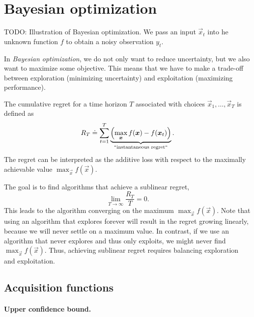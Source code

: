 \section{Bayesian optimization} \label{sec:bo}

\begin{marginfigure}
  \centering
  \caption{TODO: Illustration of Bayesian optimization. We pass an input
  $\vec{x}_t$ into he unknown function $f$ to obtain a noisy observation
  $y_t$.}
  \label{fig:bo}
\end{marginfigure}

In \textit{Bayesian optimization}, we do not only want to reduce uncertainty,
but we also want to maximize some objective. This means that we have to make a trade-off between
exploration (minimizing uncertainty) and exploitation (maximizing performance).

\begin{definition}[Regret]
  The cumulative regret for a time horizon $T$ associated with choices
  $\vec{x}_1,\ldots,\vec{x}_T$ is defined as \[
    R_T \doteq \sum_{t=1}^T \underbrace{\lft(\max_{\vec{x}} f(\vec{x}) - f(\vec{x}_t)\rgt)}_{\text{``instantaneous regret``}}
  .\]
  The regret can be interpreted as the additive loss with respect to the
  maximally achievable value $\max_{\vec{x}} f(\vec{x})$.
\end{definition}

The goal is to find algorithms that achieve a sublinear regret, \[
  \lim_{T\to\infty} \frac{R_T}{T} = 0
.\]
This leads to the algorithm converging on the maximum $\max_{\vec{x}}
f(\vec{x})$. Note that using an algorithm that explores forever will result in
the regret growing linearly, because we will never settle on a maximum value.
In contrast, if we use an algorithm that never explores and thus only
exploits, we might never find $\max_{\vec{x}} f(\vec{x})$. Thus, achieving
sublinear regret requires balancing exploration and exploitation.

\subsection{Acquisition functions}

\paragraph{Upper confidence bound.}

